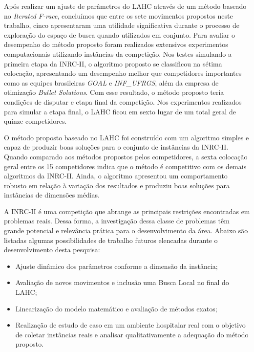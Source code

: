 \documentclass[cic,tc, twoside]{iiufrgs}
\begin{document}

Após realizar um ajuste de parâmetros do LAHC através de um método baseado no \emph{Iterated F-race}, concluímos que entre os sete movimentos propostos neste trabalho, cinco apresentaram uma utilidade significativa durante o processo de exploração do espaço de busca quando utilizados em conjunto. Para avaliar o desempenho do método proposto foram realizados extensivos experimentos computacionais utilizando instâncias da competição. Nos testes simulando a primeira etapa da INRC-II, o algoritmo proposto se classificou na sétima colocação, apresentando um desempenho melhor que competidores importantes como as equipes brasileiras \emph{GOAL} e \emph{INF\_UFRGS}, além da empresa de otimização \emph{Bullet Solutions}. 
Com esse resultado, o método proposto teria condições de disputar e etapa final da competição. Nos experimentos realizados 
para simular a etapa final, o LAHC ficou em sexto lugar de um total geral de quinze competidores.

O método proposto baseado no LAHC foi construído com um algoritmo simples e capaz de produzir boas soluções para o conjunto de instâncias da INRC-II. Quando comparado aos métodos propostos pelos competidores, a sexta colocação geral entre os 15 competidores indica que o método é competitivo com os demais algoritmos da INRC-II. Ainda, o algoritmo apresentou um comportamento robusto em relação à variação dos resultados e produziu boas soluções para instâncias de dimensões médias.

A INRC-II é uma competição que abrange as principais restrições encontradas em problemas reais. 
Dessa forma, a investigação dessa classe de problemas têm grande potencial e relevância prática para o desenvolvimento da área. Abaixo são listadas algumas possibilidades de trabalho futuros elencadas durante o desenvolvimento desta pesquisa:

\begin{itemize}[nosep]
	\item Ajuste dinâmico dos parâmetros conforme a dimensão da instância;
	\item Avaliação de novos movimentos e inclusão uma Busca Local no final do LAHC;
	\item Linearização do modelo matemático e avaliação de métodos exatos;
	\item Realização de estudo de caso em um ambiente hospitalar real com o objetivo de coletar instâncias reais e analisar qualitativamente a adequação do método proposto.
\end{itemize}
\end{document}
